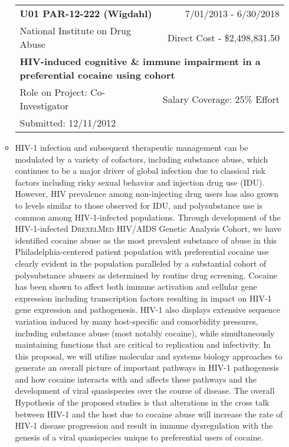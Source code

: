 \documentclass[a4paper,11pt]{article}
\makeatletter
\newenvironment{fullwidth}
    {\par
     \setlength{\@totalleftmargin}{0pt}%
     \setlength{\linewidth}{\hsize}%
     \list{}{\setlength{\leftmargin}{0pt}}
     \item\relax}
    {\endlist}
\makeatother
\begin{document}
\begin{enumerate}
\begin{itemize}
  \begin{longtable}{lr}
    \textbf{U01 PAR-12-222 (Wigdahl)} & 7/01/2013 - 6/30/2018 \\
    National Institute on Drug Abuse & Direct Cost - \$2,498,831.50 \\
    \multicolumn{2}{p{0.973\textwidth}}{\bfseries HIV-induced cognitive \& immune impairment in a preferential cocaine using cohort } \\
    Role on Project:  Co-Investigator & Salary Coverage: 25\% Effort\\
    Submitted: 12/11/2012\\
    \end{longtable}
   \begin{fullwidth}
   HIV-1 infection and subsequent therapeutic management can be modulated by a variety of cofactors, including substance abuse, which continues to be a major driver of global infection due to classical risk factors including risky sexual behavior and injection drug use (IDU). 
However, HIV prevalence among non-injecting drug users has also grown to levels similar to those observed for IDU, and polysubstance use is common among HIV-1-infected populations. 
Through development of the HIV-1-infected \textsc{DrexelMed} HIV/AIDS Genetic Analysis Cohort, we have identified cocaine abuse as the most prevalent substance of abuse in this Philadelphia-centered patient population with preferential cocaine use clearly evident in the population paralleled by a substantial cohort of polysubstance abusers as determined by routine drug screening. 
Cocaine has been shown to affect both immune activation and cellular gene expression including transcription factors resulting in impact on HIV-1 gene expression and pathogenesis. 
HIV-1 also displays extensive sequence variation induced by many host-specific and comorbidity pressures, including substance abuse (most notably cocaine), while simultaneously maintaining functions that are critical to replication and infectivity. 
In this proposal, we will utilize molecular and systems biology approaches to generate an overall picture of important pathways in HIV-1 pathogenesis and how cocaine interacts with and affects these pathways and the development of viral quasispecies over the course of disease. 
The overall Hypothesis of the proposed studies is that alterations in the cross talk between HIV-1 and the host due to cocaine abuse will increase the rate of HIV-1 disease progression and result in immune dysregulation with the genesis of a viral quasispecies unique to preferential users of cocaine. 

\end{fullwidth}
\end{itemize}
\end{enumerate}
\end{document}
